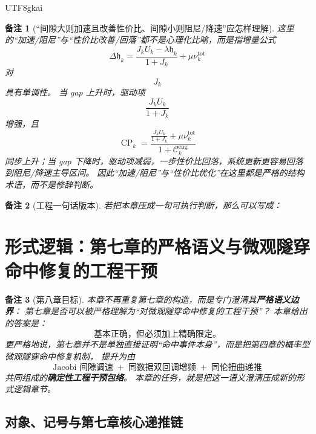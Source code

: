 \documentclass[12pt]{article}
\newtheorem{remark}{备注}[section]
\begin{document}
\begin{CJK*}{UTF8}{gkai}
\begin{remark}[“间隙大则加速且改善性价比、间隙小则阻尼/降速”应怎样理解]
这里的“加速/阻尼”与“性价比改善/回落”都不是心理化比喻，而是指增量公式
\[
  \Delta \mathfrak h_k
  =
  \frac{J_kU_k-\lambda \mathfrak h_k}{1+J_k}
  +
  \mu \nu_k^{\mathrm{tot}}
\]
对
\[
  J_k
\]
具有单调性。
当 gap 上升时，驱动项
\[
  \frac{J_kU_k}{1+J_k}
\]
增强，且
\[
  \operatorname{CP}_k
  =
  \frac{\frac{J_kU_k}{1+J_k}+\mu \nu_k^{\mathrm{tot}}}{1+\mathcal C_k^{\mathrm{eng}}}
\]
同步上升；当 gap 下降时，驱动项减弱，一步性价比回落，系统更新更容易回落到阻尼/降速主导区间。
因此“加速/阻尼”与“性价比优化”在这里都是严格的结构术语，而不是修辞判断。
\end{remark}

\begin{remark}[工程一句话版本]
若把本章压成一句可执行判断，那么可以写成：
\begin{center}
\end{center}
\end{remark}

\section{形式逻辑：第七章的严格语义与微观隧穿命中修复的工程干预}
\label{sec:tex36-ch8}

\begin{remark}[第八章目标]
本章不再重复第七章的构造，而是专门澄清其\textbf{严格语义边界}：
第七章是否可以被严格理解为“对微观隧穿命中修复的工程干预”？
本章给出的答案是：
\[
  \text{基本正确，但必须加上精确限定。}
\]
更严格地说，第七章并不是单独直接证明“命中事件本身”，而是把第四章的概率型微观隧穿命中修复机制，
提升为由
\[
  \text{Jacobi 间隙调速}
  \;+\;
  \text{同数据双回调增频}
  \;+\;
  \text{同伦扭曲递推}
\]
共同组成的\textbf{确定性工程干预包络}。
本章的任务，就是把这一语义澄清压成新的形式逻辑章节。
\end{remark}

\subsection{对象、记号与第七章核心递推链}
\label{subsec:tex36-ch8-setup}


\end{CJK*}
\end{document}
